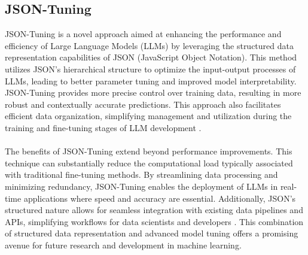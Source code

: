 \subsection*{JSON-Tuning} 
JSON-Tuning is a novel approach aimed at enhancing the performance and efficiency of Large Language Models (LLMs) by leveraging the structured data representation capabilities of JSON (JavaScript Object Notation). This method utilizes JSON's hierarchical structure to optimize the input-output processes of LLMs, leading to better parameter tuning and improved model interpretability. JSON-Tuning provides more precise control over training data, resulting in more robust and contextually accurate predictions. This approach also facilitates efficient data organization, simplifying management and utilization during the training and fine-tuning stages of LLM development \cite{zheng2024llamafactory}.
\\\\
The benefits of JSON-Tuning extend beyond performance improvements. This technique can substantially reduce the computational load typically associated with traditional fine-tuning methods. By streamlining data processing and minimizing redundancy, JSON-Tuning enables the deployment of LLMs in real-time applications where speed and accuracy are essential. Additionally, JSON's structured nature allows for seamless integration with existing data pipelines and APIs, simplifying workflows for data scientists and developers \cite{zhu2024lift}. This combination of structured data representation and advanced model tuning offers a promising avenue for future research and development in machine learning.
